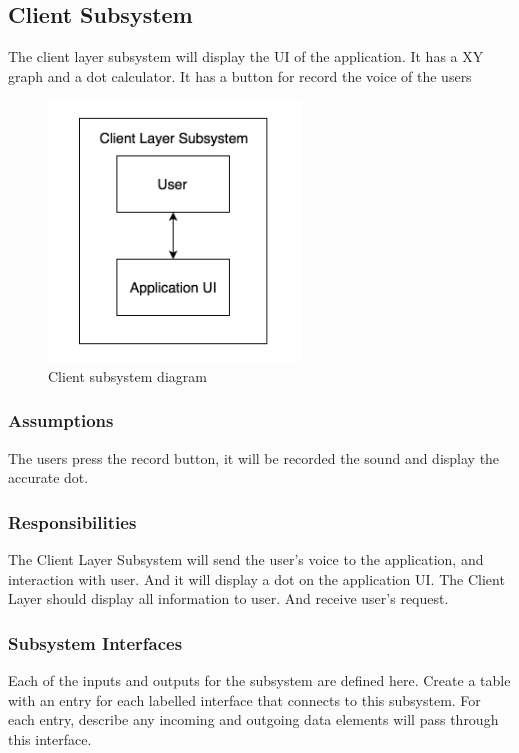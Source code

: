 \subsection{Client Subsystem}
The client layer subsystem will display the UI of the application. 
It has a XY graph and a dot calculator.
It has a button for record the voice of the users

\begin{figure}[h!]
	\centering
 	\includegraphics[width=0.60\textwidth]{images/subsystem_client.png}
 \caption{Client subsystem diagram}
\end{figure}

\subsubsection{Assumptions}
The users press the record button, it will be recorded the sound and display the accurate dot.

\subsubsection{Responsibilities}
The Client Layer Subsystem will send the user's voice to the application, and interaction with user. And it will display a dot on the application UI.
The Client Layer should display all information to user. And receive user's request.

\subsubsection{Subsystem Interfaces}
Each of the inputs and outputs for the subsystem are defined here. Create a table with an entry for each labelled interface that connects to this subsystem. For each entry, describe any incoming and outgoing data elements will pass through this interface.

